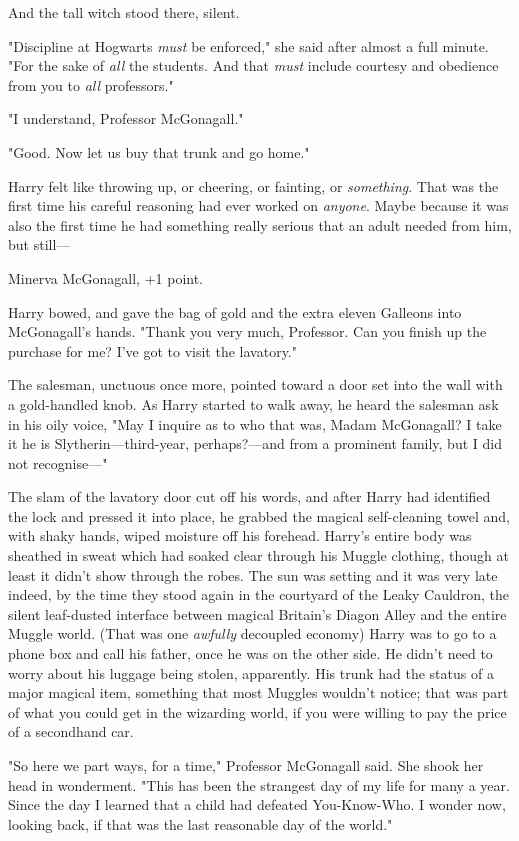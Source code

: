And the tall witch stood there, silent.

"Discipline at Hogwarts \emph{must} be enforced," she said after almost a full
minute. "For the sake of \emph{all} the students. And that \emph{must} include
courtesy and obedience from you to \emph{all} professors."

"I understand, Professor McGonagall."

"Good. Now let us buy that trunk and go home."

Harry felt like throwing up, or cheering, or fainting, or \emph{something}.
That was the first time his careful reasoning had ever worked on \emph{anyone}.
Maybe because it was also the first time he had something really serious that
an adult needed from him, but still—

Minerva McGonagall, +1 point.

Harry bowed, and gave the bag of gold and the extra eleven Galleons into
McGonagall's hands. "Thank you very much, Professor. Can you finish up the
purchase for me? I've got to visit the lavatory."

The salesman, unctuous once more, pointed toward a door set into the wall with
a gold-handled knob. As Harry started to walk away, he heard the salesman ask
in his oily voice, "May I inquire as to who that was, Madam McGonagall? I take
it he is Slytherin—third-year, perhaps?—and from a prominent family, but I
did not recognise—"

The slam of the lavatory door cut off his words, and after Harry had identified
the lock and pressed it into place, he grabbed the magical self-cleaning towel
and, with shaky hands, wiped moisture off his forehead. Harry's entire body was
sheathed in sweat which had soaked clear through his Muggle clothing, though at
least it didn't show through the robes.
\sbreak
The sun was setting and it was very late indeed, by the time they stood again
in the courtyard of the Leaky Cauldron, the silent leaf-dusted interface
between magical Britain's Diagon Alley and the entire Muggle world. (That was
one \emph{awfully} decoupled economy{\el}) Harry was to go to a phone box
and call his father, once he was on the other side. He didn't need to worry
about his luggage being stolen, apparently. His trunk had the status of a major
magical item, something that most Muggles wouldn't notice; that was part of
what you could get in the wizarding world, if you were willing to pay the price
of a secondhand car.

"So here we part ways, for a time," Professor McGonagall said. She shook her
head in wonderment. "This has been the strangest day of my life for{\el}
many a year. Since the day I learned that a child had defeated You-Know-Who. I
wonder now, looking back, if that was the last reasonable day of the world."


